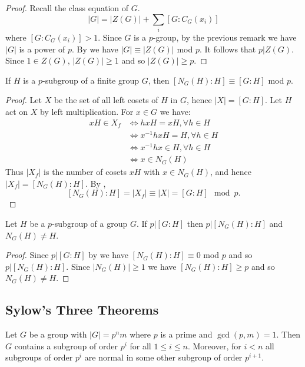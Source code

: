 \documentclass[11pt]{article}
\begin{document}
\begin{proof}
     Recall the class equation of $G$.
    \[|G|=|Z(G)|+\sum_i[G:C_G(x_i)]\]
    where $[G:C_G(x_i)]>1$. Since $G$ is a $p$-group, by the previous remark we have $|G|$ is a power of $p$. By  we have $|G|\equiv|Z(G)|$ mod $p$. It follows that $p|Z(G)$. Since $1\in Z(G)$, $|Z(G)|\geq 1$ and so $|Z(G)|\geq p$.
\end{proof}

\begin{lemma}
    If $H$ is a $p$-subgroup of a finite group $G$, then $[N_G(H):H]\equiv[G:H]$ mod $p$.
\end{lemma}

\begin{proof}
    Let $X$ be the set of all left cosets of $H$ in $G$, hence $|X|=[G:H]$. Let $H$ act on $X$ by left multiplication. For $x\in G$ we have:
    \begin{align*}
        xH\in X_f&\iff hxH=xH,\forall h\in H \\
        &\iff x^{-1}hxH=H,\forall h\in H \\
        &\iff x^{-1}hx\in H,\forall h\in H \\
        &\iff x\in N_G(H)
    \end{align*}
    Thus $|X_f|$ is the number of cosets $xH$ with $x\in N_G(H)$, and hence $|X_f|=[N_G(H):H]$. By ,
    \[[N_G(H):H]=|X_f|\equiv|X|=[G:H]\mod{p}.\]
\end{proof}

\begin{corollary}
    Let $H$ be a $p$-subgroup of a group $G$. If $p|[G:H]$ then $p|[N_G(H):H]$ and $N_G(H)\neq H$.
\end{corollary}

\begin{proof}
    Since $p|[G:H]$ by  we have $[N_G(H):H]\equiv0$ mod $p$ and so $p|[N_G(H):H]$. Since $|N_G(H)|\geq 1$ we have $[N_G(H):H]\geq p$ and so $N_G(H)\neq H$.
\end{proof}

\subsection{Sylow's Three Theorems}

\begin{theorem}
    Let $G$ be a group with $|G|=p^nm$ where $p$ is a prime and $\gcd(p,m)=1$. Then $G$ contains a subgroup of order $p^i$ for all $1\leq i\leq n$. Moreover, for $i<n$ all subgroups of order $p^i$ are normal in some other subgroup of order $p^{i+1}$.
\end{theorem}
\end{document}
